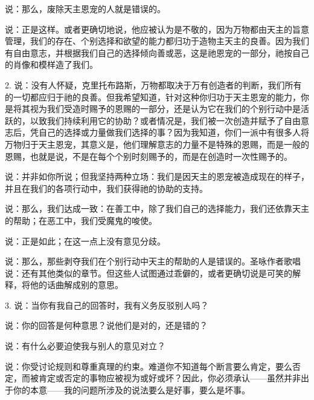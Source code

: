 说：那么，废除天主恩宠的人就是错误的。\par

说：正是这样。或者更确切地说，他应被认为是不敬的，因为万物都由天主的旨意管理，我们的存在、个别选择和欲望的能力都归功于造物主天主的良善。因为我们有自由意志，并根据我们自己的选择倾向善或恶，这是祂恩宠的一部分，祂按自己的肖像和模样造了我们。\par

2. 说：没有人怀疑，克里托布路斯，万物都取决于万有创造者的判断，我们所有的一切都应归于祂的良善。但我希望知道，针对这种你归功于天主恩宠的能力，你是将其视为我们受造时赐予的恩赐的一部分，还是认为它在我们的个别行动中是活跃的，以致我们持续利用它的协助？或者情况是，我们被一次创造并赋予了自由意志后，凭自己的选择或力量做我们选择的事？因为我知道，你们一派中有很多人将万物归于天主恩宠，其意义是，他们理解意志的力量不是特殊的恩赐，而是一般的恩赐，也就是说，不是在每个个别时刻赐予的，而是在创造时一次性赐予的。\par

说：并非如你所说；但我坚持两种立场：我们是因天主的恩宠被造成现在的样子，并且在我们的各项行动中，我们获得祂的协助的支持。\par

说：那么，我们达成一致：在善工中，除了我们自己的选择能力，我们还依靠天主的帮助；在恶工中，我们受魔鬼的唆使。\par

说：正是如此；在这一点上没有意见分歧。\par

说：那么，那些剥夺我们在个别行动中天主的帮助的人是错误的。圣咏作者歌唱说：还有其他类似的章节。但这些人试图通过乖僻的，或者更确切说是可笑的解释，将他的话曲解成别的意思。\par

3. 说：当你有我自己的回答时，我有义务反驳别人吗？\par

说：你的回答是何种意思？说他们是对的，还是错的？\par

说：有什么必要迫使我与别人的意见对立？\par

说：你受讨论规则和尊重真理的约束。难道你不知道每个断言要么肯定，要么否定，而被肯定或否定的事物应被视为或好或坏？因此，你必须承认——虽然并非出于你的本意——我的问题所涉及的说法要么是好事，要么是坏事。\par

